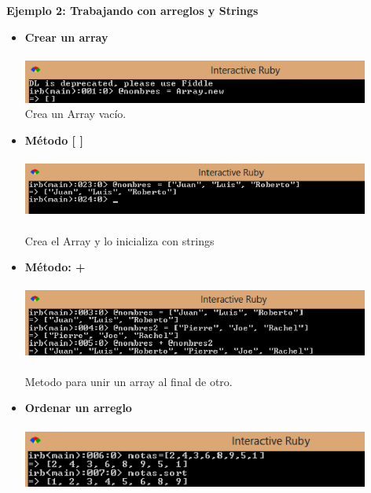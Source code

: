 \documentclass[11pt]{article} %
\begin{document}
 {\fontsize{14}{0} \bf Ejemplo 2: Trabajando con arreglos y Strings \\ }
\begin{itemize}
      \item {\bf Crear un array}\\\\

    \includegraphics[width=0.9\textwidth]{./imagenes/CreateArray}\\
Crea un Array vacío.\\


      \item {\bf Método [ ]} \\\\
    \includegraphics[width=0.9\textwidth]{./imagenes/InicializarArray}\\\\
Crea el Array y lo inicializa con strings
\newpage

      \item {\bf Método: +}\\\\
    \includegraphics[width=0.9\textwidth]{./imagenes/Metodo+}\\\\
        Metodo para unir un array al final de otro.\\

     \item {\bf Ordenar un arreglo}\\\\
    \includegraphics[width=0.9\textwidth]{./imagenes/OrdenarArreglo}\\


\end{itemize}
\end{document}
